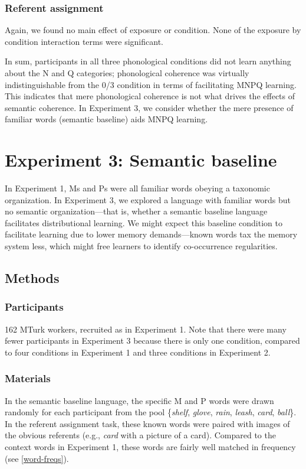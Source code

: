 \documentclass[man,floatsintext]{apa6}
\begin{document}
\subsubsection{Referent assignment}
Again, we found no main effect of exposure or condition. None of the exposure by condition interaction terms were significant.

In sum, participants in all three phonological conditions did not learn anything about the N and Q categories; phonological coherence was virtually indistinguishable from the 0/3 condition in terms of facilitating MNPQ learning. This indicates that mere phonological coherence is not what drives the effects of semantic coherence. In Experiment 3, we consider whether the mere presence of familiar words (semantic baseline) aids MNPQ learning.

\section{Experiment 3: Semantic baseline}

In Experiment 1, Ms and Ps were all familiar words obeying a taxonomic organization. In Experiment 3, we explored a language with familiar words but no semantic organization---that is, whether a semantic baseline language facilitates distributional learning. We might expect this baseline condition to facilitate learning due to lower memory demands---known words tax the memory system less, which might free learners to identify co-occurrence regularities.

\subsection{Methods}
\subsubsection{Participants}
162 MTurk workers, recruited as in Experiment 1. Note that there were many fewer participants in Experiment 3 because there is only one condition, compared to four conditions in Experiment 1 and three conditions in Experiment 2.

\subsubsection{Materials}
In the semantic baseline language, the specific M and P words were drawn randomly for each participant from the pool \{\emph{shelf}, \emph{glove}, \emph{rain}, \emph{leash}, \emph{card}, \emph{ball}\}. In the referent assignment task, these known words were paired with images of the obvious referents (e.g., \emph{card} with a picture of a card). Compared to the context words in Experiment 1, these words are fairly well matched in frequency (see \ref{word-freqs}).
\end{document}
